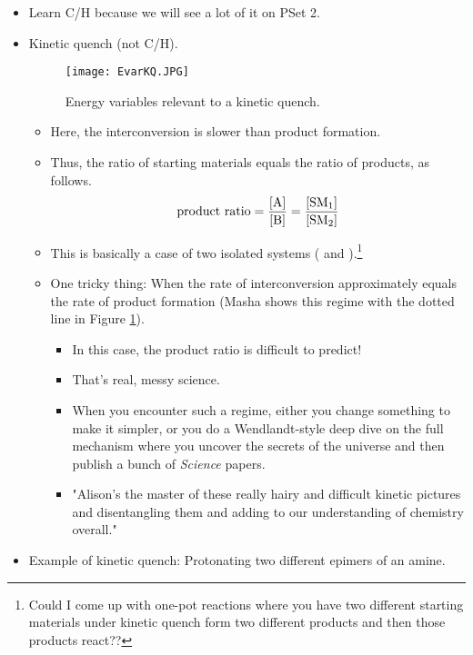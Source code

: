 \documentclass[../notes.tex]{subfiles}
\begin{document}
\begin{itemize}
\begin{itemize}
    \end{itemize}
    \item Learn C/H because we will see a lot of it on PSet 2.
    \item Kinetic quench (not C/H).
    \begin{figure}[h!]
        \centering
        \texttt{[image: EvarKQ.JPG]}
        \caption{Energy variables relevant to a kinetic quench.}
        \label{fig:EvarKQ}
    \end{figure}
    \begin{itemize}
        \item Here, the  interconversion is slower than product formation.
        \item Thus, the ratio of starting materials equals the ratio of products, as follows.
        \begin{equation*}
            \text{product ratio} = \frac{\cnc{A}}{\cnc{B}}
            = \frac{\cnc{SM1}}{\cnc{SM2}}
        \end{equation*}
        \item This is basically a case of two isolated systems ( and ).\footnote{Could I come up with one-pot reactions where you have two different starting materials under kinetic quench form two different products and then those products react??}
        \pagebreak
        \item One tricky thing: When the rate of interconversion approximately equals the rate of product formation (Masha shows this regime with the dotted line in Figure \ref{fig:EvarKQ}).
        \begin{itemize}
            \item In this case, the product ratio is difficult to predict!
            \item That's real, messy science.
            \item When you encounter such a regime, either you change something to make it simpler, or you do a Wendlandt-style deep dive on the full mechanism where you uncover the secrets of the universe and then publish a bunch of \emph{Science} papers.
            \item "Alison's the master of these really hairy and difficult kinetic pictures and disentangling them and adding to our understanding of chemistry overall."
        \end{itemize}
    \end{itemize}
    \item Example of kinetic quench: Protonating two different epimers of an amine.

\end{itemize}
\end{document}
